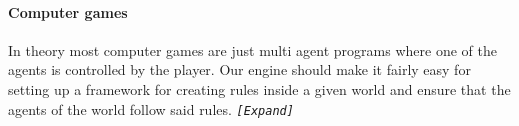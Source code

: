 \paragraph*{Computer games}

In theory most computer games are just multi agent programs where
one of the agents is controlled by the player. Our engine should make
it fairly easy for setting up a framework for creating rules inside
a given world and ensure that the agents of the world follow said
rules. \texttt{\emph{{[}Expand{]}}}
